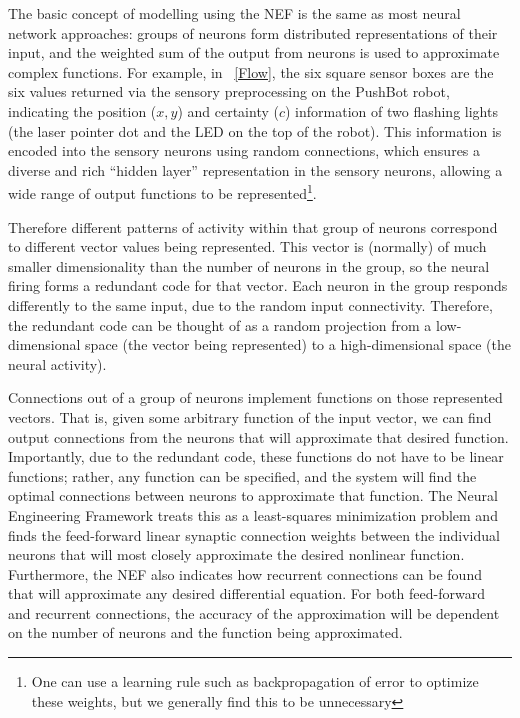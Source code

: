 \documentclass{frontiersSCNS}
\begin{document}
The basic concept of modelling using the NEF is the same as most neural network
approaches: groups of neurons form distributed representations of their input,
and the weighted sum of the output from neurons is used to approximate
complex functions.  For example, in \figurename~\ref{Flow}, the six square
sensor boxes are the six values returned via the sensory preprocessing on the
PushBot robot, indicating the position ($x, y$) and certainty ($c$) information 
of two flashing lights (the laser pointer dot and the LED on the top of the
robot).  This information is encoded into the sensory neurons using random
connections, which ensures a diverse and rich ``hidden layer''
representation in the sensory neurons, allowing a wide range of output
functions to be represented\footnote{One can use a
learning rule such as backpropagation of error to optimize these weights,
but we generally find this to be unnecessary}.

Therefore different patterns of activity within
that group of neurons correspond to different vector values being represented.
This vector is (normally) of much smaller dimensionality than the number of 
neurons in the group, so the neural firing forms a redundant code for that 
vector. Each neuron in the group responds differently to the same input, due
to the random input connectivity. Therefore, the redundant code can be thought of as a 
random projection from a low-dimensional space (the vector being represented) 
to a high-dimensional space (the neural activity). 

Connections out of a group of neurons implement functions on those represented 
vectors. That is, given some arbitrary function of the input vector, we can
find output connections from the neurons that will approximate that desired
function.  Importantly, due to 
the redundant code, these functions do not have to be linear functions; 
rather, any function can be specified, and the system will find the optimal
connections between neurons to approximate that function. The Neural Engineering 
Framework treats this as a least-squares minimization problem and finds the 
feed-forward linear synaptic connection weights between the individual neurons that will 
most closely approximate the desired nonlinear function. Furthermore, the NEF 
also indicates how recurrent connections can be found that will approximate 
any desired differential equation.  For both feed-forward and recurrent 
connections, the accuracy of the approximation will be dependent on the 
number of neurons and the function being approximated. 
\end{document}
